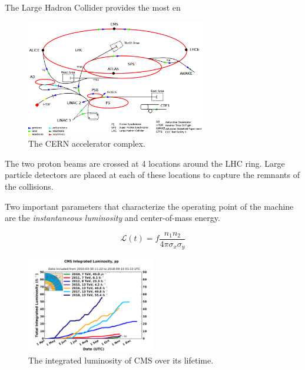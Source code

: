 The Large Hadron Collider provides the most en

\begin{figure}[hbp!]
\centering
\includegraphics[width=0.7\textwidth]{figs/lhcschematic.png}
\caption{The CERN accelerator complex.}
\label{fig:lhc}
\end{figure}

The two proton beams are crossed at 4 locations around the LHC ring. Large particle detectors are placed at each of these locations to capture the remnants of the collisions.

Two important parameters that characterize the operating point of the machine are the \textit{instantaneous luminosity} and center-of-mass energy.



\begin{equation}
\mathcal{L}(t) = f \frac{n_{1} n_{2}}{4\pi\sigma_{x}\sigma_{y}}
\end{equation}

\begin{figure}[hbp!]
\centering
\includegraphics[width=0.5\textwidth]{figs/int_lumi_cumulative_pp_2.pdf}
\caption{The integrated luminosity of CMS over its lifetime.}
\label{fig:lumi}
\end{figure}
